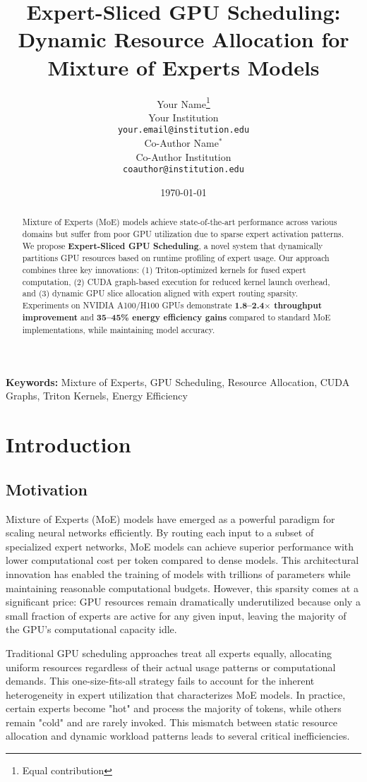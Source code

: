 \documentclass{article}
\title{Expert-Sliced GPU Scheduling: Dynamic Resource Allocation for Mixture of Experts Models}
\author{
    Your Name\thanks{Equal contribution} \\
    Your Institution \\
    \texttt{your.email@institution.edu} \\
    \And
    Co-Author Name$^*$ \\
    Co-Author Institution \\
    \texttt{coauthor@institution.edu}
}
\date{\today}
\begin{document}
\maketitle

\begin{abstract}
Mixture of Experts (MoE) models achieve state-of-the-art performance across various domains but suffer from poor GPU utilization due to sparse expert activation patterns. We propose \textbf{Expert-Sliced GPU Scheduling}, a novel system that dynamically partitions GPU resources based on runtime profiling of expert usage. Our approach combines three key innovations: (1) Triton-optimized kernels for fused expert computation, (2) CUDA graph-based execution for reduced kernel launch overhead, and (3) dynamic GPU slice allocation aligned with expert routing sparsity. Experiments on NVIDIA A100/H100 GPUs demonstrate \textbf{1.8--2.4$\times$ throughput improvement} and \textbf{35--45\% energy efficiency gains} compared to standard MoE implementations, while maintaining model accuracy.
\end{abstract}

\textbf{Keywords:} Mixture of Experts, GPU Scheduling, Resource Allocation, CUDA Graphs, Triton Kernels, Energy Efficiency

\section{Introduction}

\subsection{Motivation}

Mixture of Experts (MoE) models have emerged as a powerful paradigm for scaling neural networks efficiently. By routing each input to a subset of specialized expert networks, MoE models can achieve superior performance with lower computational cost per token compared to dense models. This architectural innovation has enabled the training of models with trillions of parameters while maintaining reasonable computational budgets. However, this sparsity comes at a significant price: GPU resources remain dramatically underutilized because only a small fraction of experts are active for any given input, leaving the majority of the GPU's computational capacity idle.

Traditional GPU scheduling approaches treat all experts equally, allocating uniform resources regardless of their actual usage patterns or computational demands. This one-size-fits-all strategy fails to account for the inherent heterogeneity in expert utilization that characterizes MoE models. In practice, certain experts become "hot" and process the majority of tokens, while others remain "cold" and are rarely invoked. This mismatch between static resource allocation and dynamic workload patterns leads to several critical inefficiencies.
\end{document}

